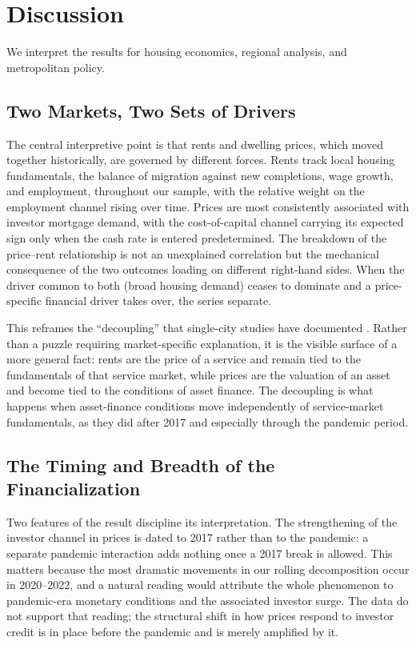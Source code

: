 \documentclass[preprint,11pt,authoryear]{elsarticle}
\begin{document}
\section{Discussion}
\label{sec:discussion}

We interpret the results for housing economics, regional analysis, and
metropolitan policy.

\subsection{Two Markets, Two Sets of Drivers}

The central interpretive point is that rents and dwelling prices, which
moved together historically, are governed by different forces. Rents
track local housing fundamentals, the balance of migration against
new completions, wage growth, and employment, throughout our sample,
with the relative weight on the employment channel rising over time.
Prices are most consistently associated with investor mortgage demand,
with the cost-of-capital channel carrying its expected sign only when the
cash rate is entered predetermined. The breakdown of the
price--rent relationship is not an unexplained correlation but the
mechanical consequence of the two outcomes loading on different
right-hand sides. When the driver common to both (broad housing demand)
ceases to dominate and a price-specific financial driver takes over, the
series separate.

This reframes the ``decoupling'' that single-city studies have
documented \citep{egan2023regime, greenaway2023impact}. Rather than a
puzzle requiring market-specific explanation, it is the visible surface
of a more general fact: rents are the price of a service and remain tied
to the fundamentals of that service market, while prices are the
valuation of an asset and become tied to the conditions of asset
finance. The decoupling is what happens when asset-finance conditions
move independently of service-market fundamentals, as they did after
2017 and especially through the pandemic period.

\subsection{The Timing and Breadth of the Financialization}

Two features of the result discipline its interpretation. The
strengthening of the investor channel in prices is dated to 2017 rather
than to the pandemic: a separate pandemic interaction adds nothing once
a 2017 break is allowed. This matters because the most dramatic
movements in our rolling decomposition occur in 2020--2022, and a
natural reading would attribute the whole phenomenon to pandemic-era
monetary conditions and the associated investor surge. The data do not
support that reading; the structural shift in how prices respond to
investor credit is in place before the pandemic and is merely amplified
by it.
\end{document}
